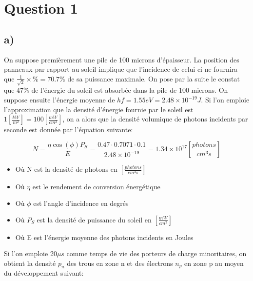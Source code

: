 



\label{s:experimentation}
\chapter{Question 1}
\section{a)}

On suppose premièrement une pile de 100 microns d'épaisseur. La position des panneaux par rapport au soleil implique que l'incidence de celui-ci ne fournira que $\frac{1}{\sqrt{2}}\times\% = 70.7\%$ de sa puissance maximale. On pose par la suite le constat que 47\% de l'énergie du soleil est absorbée dans la pile de 100 microns. On suppose ensuite l'énergie moyenne de $hf = 1.55eV = 2.48 \times 10^{-19} J$. Si l'on emploie l'approximation que la densité d'énergie fournie par le soleil est $1\left[\frac{kW}{m^2}\right] = 100\left[\frac{mW}{cm^2}\right]$, on a alors que la densité volumique de photons incidents par seconde est donnée par l'équation suivante:

\begin{equation}
\label{eq0}
N = \frac{\eta \cos(\phi)P_S}{E} = \frac{0.47 \cdot 0.7071 \cdot 0.1}{2.48 \times 10^{-19}} = 1.34\times 10^{17} \left[\frac{photons}{cm^3 s }\right]
\end{equation}
\begin{itemize}
\item Où N est la densité de photons en $\left[\frac{photons}{cm^3 s }\right]$
\item Où $\eta$ est le rendement de conversion énergétique
\item Où $\phi$ est l'angle d'incidence en degrés
\item Où $P_S$ est la densité de puissance du soleil en $\left[\frac{mW}{cm^2}\right]$
\item Où E est l'énergie moyenne des photons incidents en Joules
\end{itemize}

Si l'on emploie 20$\mu s$ comme temps de vie des porteurs de charge minoritaires, on obtient la densité $p_n$ des trous en zone n et des électrons $n_p$ en zone p au moyen du développement suivant:

